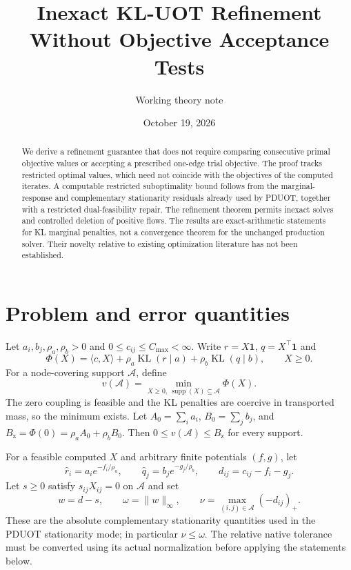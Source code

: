 \documentclass[11pt]{article}
\title{Inexact KL-UOT Refinement Without Objective Acceptance Tests}
\author{Working theory note}
\date{October 19, 2026}
\newcommand{\KL}{\operatorname{KL}}
\newcommand{\supp}{\operatorname{supp}}
\begin{document}
\maketitle

\begin{abstract}
We derive a refinement guarantee that does not require comparing consecutive primal objective values or accepting a prescribed one-edge trial objective.
The proof tracks restricted optimal values, which need not coincide with the objectives of the computed iterates.
A computable restricted suboptimality bound follows from the marginal-response and complementary stationarity residuals already used by PDUOT, together with a restricted dual-feasibility repair.
The refinement theorem permits inexact solves and controlled deletion of positive flows.
The results are exact-arithmetic statements for KL marginal penalties, not a convergence theorem for the unchanged production solver.
Their novelty relative to existing optimization literature has not been established.
\end{abstract}

\section{Problem and error quantities}
Let $a_i,b_j,\rho_a,\rho_b>0$ and $0\leq c_{ij}\leq C_{\max}<\infty$.
Write $r=X\mathbf1$, $q=X^\top\mathbf1$ and
$$\Phi(X)=\langle c,X\rangle+\rho_a\KL(r\mid a)+\rho_b\KL(q\mid b),\qquad X\geq0.$$
For a node-covering support $\mathcal A$, define
$$v(\mathcal A)=\min_{X\geq0,\ \supp(X)\subseteq\mathcal A}\Phi(X).$$
The zero coupling is feasible and the KL penalties are coercive in transported mass, so the minimum exists.
Let $A_0=\sum_i a_i$, $B_0=\sum_j b_j$, and $B_{\mathrm z}=\Phi(0)=\rho_aA_0+\rho_bB_0$.
Then $0\leq v(\mathcal A)\leq B_{\mathrm z}$ for every support.

For a feasible computed $X$ and arbitrary finite potentials $(f,g)$, let
$$\widehat r_i=a_i e^{-f_i/\rho_a},\qquad \widehat q_j=b_j e^{-g_j/\rho_b},\qquad d_{ij}=c_{ij}-f_i-g_j.$$
Let $s\geq0$ satisfy $s_{ij}X_{ij}=0$ on $\mathcal A$ and set
$$w=d-s,\qquad \omega=\|w\|_\infty,\qquad \nu=\max_{(i,j)\in\mathcal A}(-d_{ij})_+.$$
These are the absolute complementary stationarity quantities used in the PDUOT stationarity mode; in particular $\nu\leq\omega$.
The relative native tolerance must be converted using its actual normalization before applying the statements below.
\end{document}
